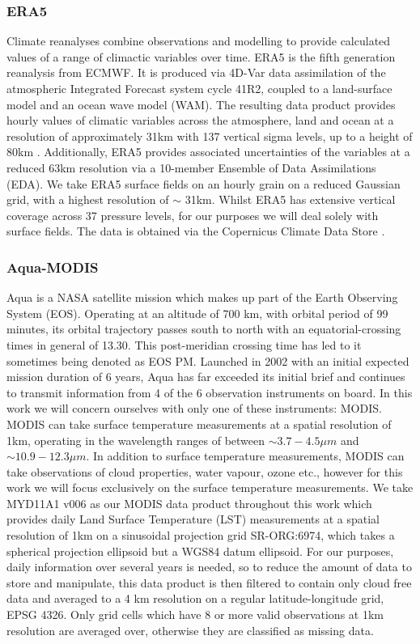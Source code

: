 \documentclass[twocolumn]{article}
\begin{document}
\subsubsection{ERA5}
Climate reanalyses combine observations and modelling to provide calculated values of a range of climactic variables over time. ERA5 is the fifth generation  reanalysis from ECMWF.  It is produced via 4D-Var data assimilation  of the atmospheric Integrated Forecast system cycle 41R2, coupled to a land-surface model \cite[ECLand,][]{Boussetta2021} and an ocean wave model (WAM). The resulting data product provides hourly values of climatic variables across the atmosphere, land and ocean at a resolution of approximately 31km with 137 vertical sigma levels, up to a height of 80km . Additionally, ERA5 provides associated uncertainties of the variables at a reduced 63km resolution via a 10-member Ensemble of Data Assimilations (EDA). We take ERA5 surface fields on an hourly grain on a reduced Gaussian grid, with a highest resolution of $\sim$ 31km. Whilst ERA5 has extensive vertical coverage across 37 pressure levels, for our purposes we will deal solely with surface fields. The data is obtained via the Copernicus Climate Data Store \cite[CDS,][]{CDS}. 



\subsubsection{Aqua-MODIS}
Aqua\cite{aquaref} is a NASA satellite mission which makes up part of the Earth Observing System (EOS). Operating at an altitude of 700 km, with orbital period of 99 minutes, its orbital trajectory passes south to north with an equatorial-crossing times in general of 13.30. This post-meridian crossing time has led to it sometimes being denoted as EOS PM. Launched in 2002 with an initial expected mission duration of 6 years, Aqua has far exceeded its initial brief and continues to transmit information from 4 of the 6 observation instruments on board. In this work we will concern ourselves with only one of these instruments: MODIS. MODIS can take surface temperature measurements at a spatial resolution of 1km, operating in the wavelength ranges of between $\sim 3.7 - 4.5 \mu m$ and $\sim 10.9 - 12.3 \mu m$. In addition to surface temperature measurements, MODIS can take observations of cloud properties, water vapour, ozone etc., however for this work we will focus exclusively on the surface temperature measurements. We take MYD11A1 v006\cite{MYD11A1} as our MODIS data product throughout this work which provides daily Land Surface Temperature (LST) measurements at a spatial resolution of 1km on a sinusoidal projection grid SR-ORG:6974, which takes a spherical projection ellipsoid but a WGS84 datum ellipsoid. For our purposes, daily information over several years is needed, so to reduce the amount of data to store and manipulate, this data product is then filtered to contain only cloud free data and averaged to a 4 km resolution on a regular latitude-longitude grid, EPSG 4326. Only grid cells which have 8 or more valid observations at 1km resolution are averaged over, otherwise they are classified as missing data.
\end{document}
